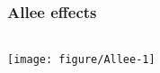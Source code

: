 \documentclass[color=usenames,dvipsnames]{beamer}\usepackage[]{graphicx}\usepackage[]{xcolor}
\begin{document}
\begin{frame}[fragile]
  \frametitle{Allee effects}

  \begin{columns}
    \column{\dimexpr\paperwidth-10pt}
  \texttt{[image: figure/Allee-1]}
  \end{columns}
\end{frame}









\end{document}
